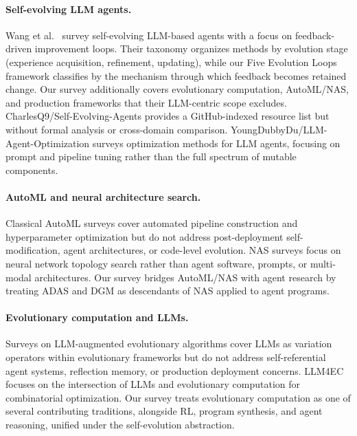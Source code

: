 \paragraph{Self-evolving LLM agents.} Wang et al.\ \cite{wang2025selfevolving} survey self-evolving LLM-based agents with a focus on feedback-driven improvement loops. Their taxonomy organizes methods by evolution stage (experience acquisition, refinement, updating), while our Five Evolution Loops framework classifies by the mechanism through which feedback becomes retained change. Our survey additionally covers evolutionary computation, AutoML/NAS, and production frameworks that their LLM-centric scope excludes. CharlesQ9/Self-Evolving-Agents \cite{charlesq9selfevolving} provides a GitHub-indexed resource list but without formal analysis or cross-domain comparison. YoungDubbyDu/LLM-Agent-Optimization \cite{youngdubbydu2026optimization} surveys optimization methods for LLM agents, focusing on prompt and pipeline tuning rather than the full spectrum of mutable components.

\paragraph{AutoML and neural architecture search.} Classical AutoML surveys \cite{he2021automl,yao2018taking} cover automated pipeline construction and hyperparameter optimization but do not address post-deployment self-modification, agent architectures, or code-level evolution. NAS surveys \cite{elsken2019neural,ren2021comprehensive} focus on neural network topology search rather than agent software, prompts, or multi-modal architectures. Our survey bridges AutoML/NAS with agent research by treating ADAS \cite{adas2025} and DGM \cite{darwingodelmachine2025} as descendants of NAS applied to agent programs.

\paragraph{Evolutionary computation and LLMs.} Surveys on LLM-augmented evolutionary algorithms \cite{yang2024large,liu2024large} cover LLMs as variation operators within evolutionary frameworks but do not address self-referential agent systems, reflection memory, or production deployment concerns. LLM4EC \cite{wuxingyu2025llm4ec} focuses on the intersection of LLMs and evolutionary computation for combinatorial optimization. Our survey treats evolutionary computation as one of several contributing traditions, alongside RL, program synthesis, and agent reasoning, unified under the self-evolution abstraction.

